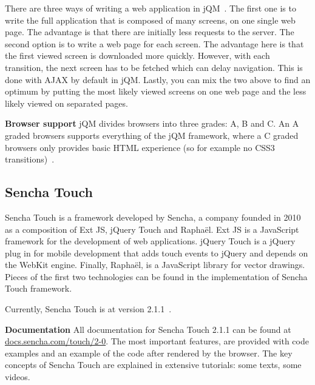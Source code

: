 \documentclass[a4paper]{artikel3}
\renewcommand{\url}[1]{\href{http://#1}{#1}}
\renewcommand{\paragraph}[1]{{\bf #1} }
\begin{document}
There are three ways of writing a web application in jQM~\cite{Broulik2012}. 
The first one is to write the full application that is composed of many screens, on one single web page.
The advantage is that there are initially less requests to the server.
The second option is to write a web page for each screen. 
The advantage here is that the first viewed screen is downloaded more quickly. 
However, with each transition, the next screen has to be fetched which can delay navigation.
This is done with AJAX by default in jQM.
Lastly, you can mix the two above to find an optimum by putting the most likely viewed screens on one web page and the less likely viewed on separated pages.  

\paragraph{Browser support}
\label{sec:jqm-browser-support}
jQM divides browsers into three grades: A, B and C. 
An A graded browsers supports everything of the jQM framework, where a C graded browsers only provides basic HTML experience (so for example no CSS3 transitions)~\cite{JQuery2012d}.

\subsection{Sencha Touch} %
\label{sec:sencha_touch}

Sencha Touch is a framework developed by Sencha,  a company founded in 2010 as a composition of Ext JS, jQuery Touch and Raphaël.  Ext JS is a JavaScript framework for the development of web applications.  jQuery Touch is a jQuery plug in for mobile development that adds touch events to jQuery and depends on the WebKit engine.  Finally,  Raphaël, is a JavaScript library for vector drawings.  Pieces of the first two technologies can be found in the implementation of Sencha Touch framework.    

Currently,  Sencha Touch is at version 2.1.1~\cite{Inc.}.

\paragraph{Documentation}
All documentation for Sencha Touch 2.1.1 can be found at \url{docs.sencha.com/touch/2-0}.  The most important features,  are provided with code examples and an example of the code after rendered by the browser.  The key concepts of Sencha Touch are explained in extensive tutorials:  some texts, some videos.  
\end{document}
